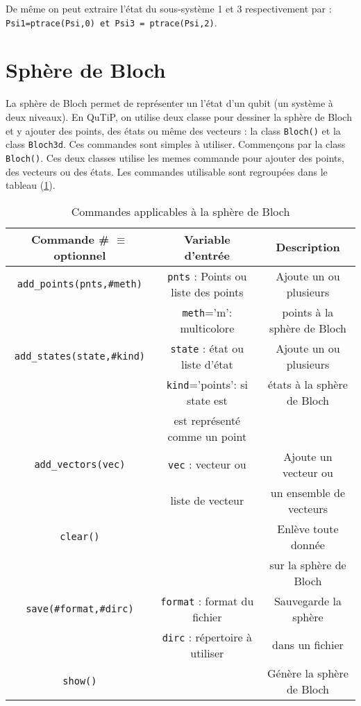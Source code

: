 De même on peut extraire l'état du sous-système 1 et 3 respectivement par :\\ \texttt{Psi1=ptrace(Psi,0) et Psi3 = ptrace(Psi,2)}.

\section{Sphère de Bloch}
La sphère de Bloch permet de représenter un l'état d'un qubit (un système à deux niveaux). En QuTiP, on utilise deux classe pour dessiner la sphère de Bloch et y ajouter des points, des états ou même des vecteurs : la class \texttt{Bloch()} et la class \texttt{Bloch3d}. Ces commandes sont simples à utiliser. Commençons par la class \texttt{Bloch()}. Ces deux classes utilise les memes commande pour ajouter des points, des vecteurs ou des états. Les commandes utilisable sont regroupées dans le tableau (\ref{Bloch}).
\begin{table}[!h]
\begin{center}
\begin{tabular}{|c|c|c|}\hline \hline
\textbf{Commande \# $\equiv$ optionnel} & \textbf{Variable d'entrée} & \textbf{Description} \\ \hline \hline
\texttt{add\_points(pnts,\#meth)} & \texttt{pnts} : Points ou liste des points & Ajoute un ou plusieurs\\
 & \texttt{meth}='m': multicolore & points à la sphère de Bloch \\ \hline
\texttt{add\_states(state,\#kind)} & \texttt{state} : état ou liste d'état & Ajoute un ou plusieurs \\
 & \texttt{kind}='points': si state est & états à la sphère de Bloch \\
 & est représenté comme un point & \\ \hline
\texttt{add\_vectors(vec)} & \texttt{vec} : vecteur ou & Ajoute un vecteur ou \\
 & liste de vecteur & un ensemble de vecteurs \\ \hline
\texttt{clear()} & & Enlève toute donnée \\
 & & sur la sphère de Bloch \\ \hline
\texttt{save(\#format,\#dirc)} & \texttt{format} : format du fichier & Sauvegarde la sphère \\
 & \texttt{dirc} : répertoire à utiliser & dans un fichier \\ \hline
\texttt{show()} & & Génère la sphère de Bloch\\ \hline
\end{tabular}
\end{center}
\caption{Commandes applicables à la sphère de Bloch}
\label{Bloch}
\end{table}

